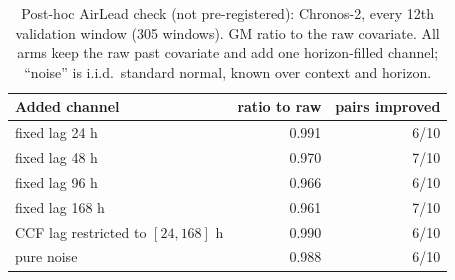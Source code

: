 \begin{table}[t]\centering\small
\caption{Post-hoc AirLead check (not pre-registered): Chronos-2, every 12th validation window (\num{305} windows). GM ratio to the raw covariate. All arms keep the raw past covariate and add one horizon-filled channel; ``noise'' is i.i.d.\ standard normal, known over context and horizon.}
\label{tab:air_explo}
\begin{tabular}{lrr}
\toprule
Added channel & ratio to raw & pairs improved \\
\midrule
fixed lag 24 h & 0.991 & 6/10 \\
fixed lag 48 h & 0.970 & 7/10 \\
fixed lag 96 h & 0.966 & 6/10 \\
fixed lag 168 h & 0.961 & 7/10 \\
CCF lag restricted to $[24,168]$ h & 0.990 & 6/10 \\
pure noise & 0.988 & 6/10 \\
\bottomrule
\end{tabular}
\end{table}